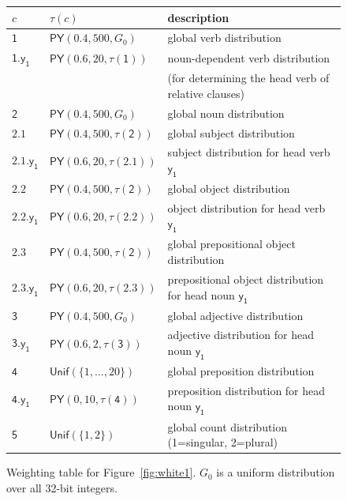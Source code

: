\documentclass[11pt,a4paper]{article}
\renewcommand{\bnfpn}[1]{\mathsf{#1}}
\begin{document}
\begin{figure}[p]
\centering
\begin{tabular}{lll} 
$c$&$\tau(c)$&description\\
\hline \hline
$\bnfpn{1}$ & $\mathsf{PY}(0.4, 500, G_0)$ & global verb distribution \\
$\bnfpn{1.y_1}$ & $\mathsf{PY}(0.6, 20, \tau(\bnfpn{1}))$ & noun-dependent verb distribution \\
&& (for determining the head verb of relative clauses) \\
$\bnfpn{2}$ & $\mathsf{PY}(0.4, 500, G_0)$ & global noun distribution \\
$\bnfpn{2.1}$ & $\mathsf{PY}(0.4, 500, \tau(\bnfpn{2}))$ & global subject distribution \\
$\bnfpn{2.1.y_1}$ & $\mathsf{PY}(0.6, 20, \tau(\bnfpn{2.1}))$ & subject distribution for head verb $\bnfpn{y_1}$ \\
$\bnfpn{2.2}$ & $\mathsf{PY}(0.4, 500, \tau(\bnfpn{2}))$ & global object distribution \\
$\bnfpn{2.2.y_1}$ & $\mathsf{PY}(0.6, 20, \tau(\bnfpn{2.2}))$ & object distribution for head verb $\bnfpn{y_1}$ \\
$\bnfpn{2.3}$ & $\mathsf{PY}(0.4, 500, \tau(\bnfpn{2}))$ & global prepositional object distribution \\
$\bnfpn{2.3.y_1}$ & $\mathsf{PY}(0.6, 20, \tau(\bnfpn{2.3}))$ & prepositional object distribution for head noun $\bnfpn{y_1}$ \\
$\bnfpn{3}$ & $\mathsf{PY}(0.4, 500, G_0)$ & global adjective distribution \\
$\bnfpn{3.y_1}$ & $\mathsf{PY}(0.6, 2, \tau(\bnfpn{3}))$ & adjective distribution for head noun $\bnfpn{y_1}$\\
$\bnfpn{4}$ & $\mathsf{Unif}(\{1, ..., 20\})$ & global preposition distribution \\
$\bnfpn{4.y_1}$ & $\mathsf{PY}(0, 10, \tau(\bnfpn{4}))$ & preposition distribution for head noun $\bnfpn{y_1}$\\
$\bnfpn{5}$ & $\mathsf{Unif}(\{1, 2\})$ & global count distribution (1=singular, 2=plural) \\
\end{tabular}
\caption{Weighting table for Figure~\ref{fig:white1}. $G_0$ is a uniform distribution over all 32-bit integers. \label{fig:white2}}
\end{figure}
\end{document}
